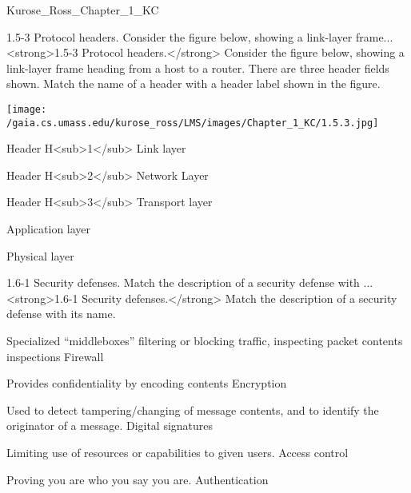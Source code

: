 \documentclass[a4paper,twocolumn]{article}
\begin{document}
\begin{quiz}{Kurose_Ross_Chapter_1_KC}
\begin{matching}[
	points=1,
	penalty=0.33333,
]{1.5-3 Protocol headers. Consider the figure below, showing a link-layer frame...}
<strong>1.5-3 Protocol headers.</strong> Consider the figure below, showing a link-layer frame heading from a host to a router.  There are three header fields shown.  Match the name of a header with a header label shown in the figure. 
\begin{center}
\texttt{[image: /gaia.cs.umass.edu/kurose\_ross/LMS/images/Chapter\_1\_KC/1.5.3.jpg]}
\end{center}

\item Header H<sub>1</sub> \answer Link layer
\item Header H<sub>2</sub> \answer Network Layer
\item Header H<sub>3</sub> \answer Transport layer
\item \answer Application layer
\item \answer Physical layer
\end{matching}

\begin{matching}[
	points=1,
	penalty=0.33333,
]{1.6-1 Security defenses.  Match the description of a security defense with ...}
<strong>1.6-1 Security defenses.</strong>  Match the description of a security defense with its name.
\item Specialized “middleboxes” filtering or blocking traffic, inspecting packet contents inspections \answer Firewall
\item Provides confidentiality by encoding contents \answer Encryption
\item Used to detect tampering/changing of message contents, and to identify the originator of a message. \answer Digital signatures
\item Limiting use of resources or capabilities to given users. \answer Access control
\item Proving you are who you say you are. \answer Authentication
\end{matching}


\end{quiz}
\end{document}
